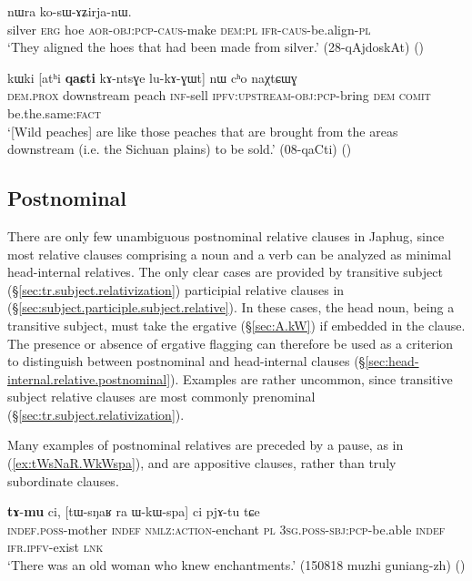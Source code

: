\begin{exe}
\ex \label{ex:qaR.thWkAsWBzu}
 nɯra ko-sɯ-ɤʑirja-nɯ. \\
silver \textsc{erg} hoe \textsc{aor}-\textsc{obj}:\textsc{pcp}-\textsc{caus}-make \textsc{dem}:\textsc{pl} \textsc{ifr}-\textsc{caus}-be.align-\textsc{pl} \\
\glt `They aligned the hoes that had been made from silver.' (28-qAjdoskAt)
()
\end{exe}  

\begin{exe}
\ex \label{ex:kAntsGe.lukAGWt}
\gll kɯki [atʰi \textbf{qaɕti} kɤ-ntsɣe lu-kɤ-ɣɯt] nɯ cʰo naχtɕɯɣ \\
\textsc{dem}.\textsc{prox} downstream peach \textsc{inf}-sell \textsc{ipfv}:\textsc{upstream}-\textsc{obj}:\textsc{pcp}-bring \textsc{dem} \textsc{comit} be.the.same:\textsc{fact} \\
\glt `[Wild peaches] are  like those peaches that are brought from the areas downstream (i.e. the Sichuan plains) to be sold.' (08-qaCti)
()
\end{exe}  
 
 \subsection{Postnominal} \label{sec:postnominal.relative}
 There are only few unambiguous postnominal relative clauses in Japhug, since most relative clauses comprising a noun and a verb can be analyzed as minimal head-internal relatives. The only clear cases are provided by transitive subject (§\ref{sec:tr.subject.relativization}) participial relative clauses in  (§\ref{sec:subject.participle.subject.relative}). In these cases, the head noun, being a transitive subject,  must take the ergative  (§\ref{sec:A.kW}) if embedded in the clause. The presence or absence of ergative flagging can therefore be used as a criterion to distinguish between postnominal and head-internal clauses (§\ref{sec:head-internal.relative.postnominal}). Examples are rather uncommon, since transitive subject relative clauses are most commonly prenominal (§\ref{sec:tr.subject.relativization}). 

Many examples of postnominal relatives are preceded by a pause, as in (\ref{ex:tWsNaR.WkWspa}), and are appositive clauses, rather than truly subordinate clauses. 

 \begin{exe}
\ex \label{ex:tWsNaR.WkWspa}
\gll \textbf{tɤ}-\textbf{mu} ci, [tɯ-sŋaʁ ra ɯ-kɯ-spa] ci pjɤ-tu tɕe \\
\textsc{indef}.\textsc{poss}-mother \textsc{indef} \textsc{nmlz}:\textsc{action}-enchant \textsc{pl} \textsc{3sg}.\textsc{poss}-\textsc{sbj}:\textsc{pcp}-be.able \textsc{indef} \textsc{ifr}.\textsc{ipfv}-exist \textsc{lnk} \\
\glt `There was an old woman who knew enchantments.' (150818 muzhi guniang-zh)
()
\end{exe}
 
